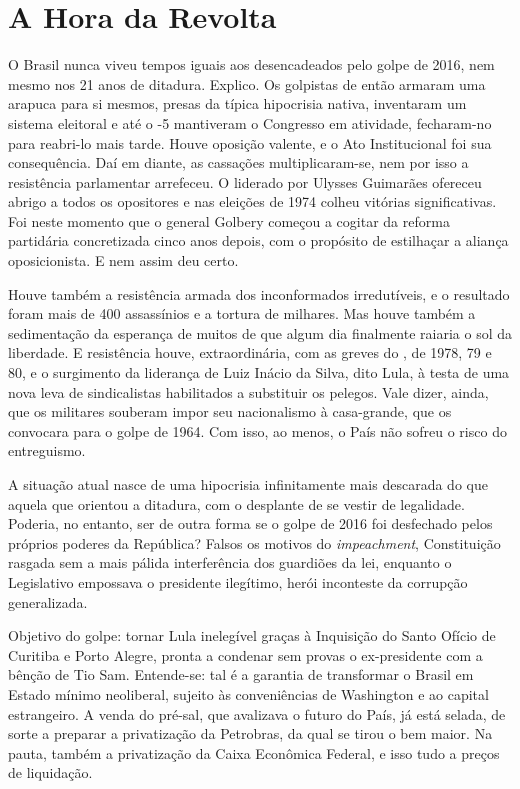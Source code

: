 \part{A Hora da Revolta}



O Brasil nunca viveu tempos iguais aos desencadeados pelo golpe de 2016,
nem mesmo nos 21 anos de ditadura. Explico. Os golpistas de então
armaram uma arapuca para si mesmos, presas da típica hipocrisia nativa,
inventaram um sistema eleitoral e até o -5 mantiveram o Congresso em
atividade, fecharam-no para reabri-lo mais tarde. Houve oposição
valente, e o Ato Institucional foi sua consequência. Daí em diante, as
cassações multiplicaram-se, nem por isso a resistência parlamentar
arrefeceu. O  liderado por Ulysses Guimarães ofereceu abrigo a todos
os opositores e nas eleições de 1974 colheu vitórias significativas. Foi
neste momento que o general Golbery começou a cogitar da reforma
partidária concretizada cinco anos depois, com o propósito de estilhaçar
a aliança oposicionista. E nem assim deu certo.

Houve também a resistência armada dos inconformados irredutíveis, e o
resultado foram mais de 400 assassínios e a tortura de milhares. Mas
houve também a sedimentação da esperança de muitos de que algum dia
finalmente raiaria o sol da liberdade. E resistência houve,
extraordinária, com as greves do , de 1978, 79 e 80, e o surgimento
da liderança de Luiz Inácio da Silva, dito Lula, à testa de uma nova
leva de sindicalistas habilitados a substituir os pelegos. Vale dizer,
ainda, que os militares souberam impor seu nacionalismo à casa-grande,
que os convocara para o golpe de 1964. Com isso, ao menos, o País não
sofreu o risco do entreguismo.

A situação atual nasce de uma hipocrisia infinitamente mais descarada do
que aquela que orientou a ditadura, com o desplante de se vestir de
legalidade. Poderia, no entanto, ser de outra forma se o golpe de 2016
foi desfechado pelos próprios poderes da República? Falsos os motivos do
\emph{impeachment}, Constituição rasgada sem a mais pálida interferência
dos guardiões da lei, enquanto o Legislativo empossava o presidente
ilegítimo, herói inconteste da corrupção generalizada.

Objetivo do golpe: tornar Lula inelegível graças à Inquisição do Santo
Ofício de Curitiba e Porto Alegre, pronta a condenar sem provas o
ex-presidente com a bênção de Tio Sam. Entende-se: tal é a garantia de
transformar o Brasil em Estado mínimo neoliberal, sujeito às
conveniências de Washington e ao capital estrangeiro. A venda do
pré-sal, que avalizava o futuro do País, já está selada, de sorte a
preparar a privatização da Petrobras, da qual se tirou o bem maior. Na
pauta, também a privatização da Caixa Econômica Federal, e isso tudo a
preços de liquidação.

